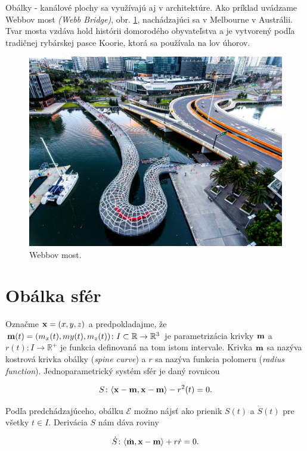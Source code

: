 Obálky - kanálové plochy sa využívajú aj v architektúre. Ako príklad uvádzame Webbov most \textit{(Webb Bridge)}, obr. \ref{fig:webb_bridge}, nachádzajúci sa v Melbourne v Austrálii. Tvar mosta vzdáva hold histórii domorodého obyvateľstva a je vytvorený podľa tradičnej rybárskej pasce Koorie, ktorá sa používala na lov úhorov.

\begin{figure}[h!]
	\centering
	\includegraphics[width=\textwidth]{images/webb_bridge.jpg}
	\caption{Webbov most.}
	\label{fig:webb_bridge}
\end{figure}

\section{Obálka sfér}
Označme $\bold{x} = (x, y, z)$ a predpokladajme, že $\bold{m}(t) = (m_x(t), my(t), m_z(t)) \colon I \subset \mathbb{R} \rightarrow \mathbb{R}^3$ je parametrizácia krivky $\bold{m}$ a $r(t) \colon I \rightarrow \mathbb{R}^{+}$ je funkcia definovaná na tom istom intervale. Krivka $\bold{m}$ sa nazýva kostrová krivka obálky (\textit{spine curve}) a $r$ sa nazýva funkcia polomeru (\textit{radius function}). Jednoparametrický systém sfér je daný rovnicou

$$
S \colon \langle \bold{x} - \bold{m}, \bold{x} - \bold{m} \rangle - r^2(t)= 0.
$$

Podľa predchádzajúceho, obálku $\mathcal{E}$ možno nájsť ako prienik $S(t)$ a $\dot{S}(t)$ pre všetky $t \in I$. Derivácia $S$ nám dáva roviny

$$
\dot{S} \colon \langle \dot{\bold{m}}, \bold{x} - \bold{m} \rangle + r \dot{r} = 0.
$$

